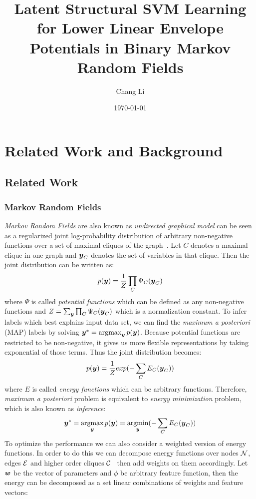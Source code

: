 \documentclass[twoside,doublespace,onecolumn,11pt,a4paper]{book}
\title{Latent Structural SVM Learning for Lower Linear
  Envelope Potentials in Binary Markov Random Fields}
\author{Chang Li} \date{\today}
\renewcommand{\cite}{\citep}
\begin{document}

\chapter{Related Work and Background}
\label{cha:RelatedWorks}

\section{Related Work}
\subsection{Markov Random Fields}
\label{sec:MRF}
\emph{Markov Random Fields} are also known as \emph{undirected
  graphical model} can be seen as a regularized joint
log-probability distribution of arbitrary non-negative functions
over a set of maximal cliques of the
graph~\cite{bishop:2006:PRML}. Let $C$ denotes a maximal clique
in one graph and ${\boldsymbol{y}}_C$ denotes the set of variables in that
clique. Then the joint distribution can be written as:
\begin{align}
  p({\boldsymbol{y}})=\frac{1}{Z}\prod_{C}{\Psi_C({\boldsymbol{y}}_C)}
\end{align}
\noindent where $\Psi$ is called \emph{potential functions} which
can be defined as any non-negative functions and
$Z=\sum_{{\boldsymbol{y}}}\prod_{C}{\Psi_C({\boldsymbol{y}}_C)}$ which is a normalization
constant. To infer labels which best explains input data set, we
can find the \emph{maximum a posteriori} (MAP) labels by solving
${\boldsymbol{y}}^*=\mathop{\textrm{argmax}}_{{\boldsymbol{y}}}p({\boldsymbol{y}})$. Because potential functions are
restricted to be non-negative, it gives us more flexible
representations by taking exponential of those terms. Thus the
joint distribution becomes:
\begin{align}
  p({\boldsymbol{y}})=\frac{1}{Z}exp(-\sum_{C}{E_C({\boldsymbol{y}}_C)})
\end{align}
\noindent where $E$ is called \emph{energy functions} which can be
arbitrary functions. Therefore, \emph{maximum a posteriori}
problem is equivalent to \emph{energy minimization} problem,
which is also known as \emph{inference}:
\begin{align}
  {\boldsymbol{y}}^*=\mathop{\textrm{argmax}}_{{\boldsymbol{y}}}p({\boldsymbol{y}})=\mathop{\textrm{argmin}}_{{\boldsymbol{y}}}(-\sum_{C}{E_C({\boldsymbol{y}}_C)})
\end{align}
To optimize the performance we can also consider a weighted
version of energy functions. In order to do this we can decompose
energy functions over nodes ${\cal N}$, edges ${\cal E}$ and higher order
cliques ${\cal C}$~\cite{Szummer:ECCV08} then add weights on them
accordingly. Let ${\boldsymbol{w}}$ be the vector of parameters and $\phi$ be
arbitrary feature function, then the energy can be decomposed as
a set linear combinations of weights and feature vectors:
\end{document}
